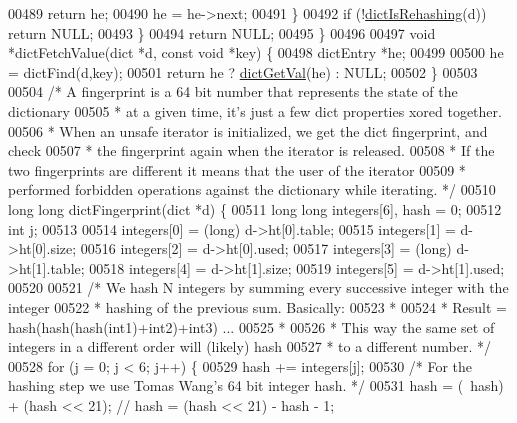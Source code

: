 \begin{DoxyCode}
00489                 \textcolor{keywordflow}{return} he;
00490             he = he->next;
00491         \}
00492         \textcolor{keywordflow}{if} (!\hyperlink{dict_8h_aa6e4917a6a32fdf47180e03ed8969e02}{dictIsRehashing}(d)) \textcolor{keywordflow}{return} NULL;
00493     \}
00494     \textcolor{keywordflow}{return} NULL;
00495 \}
00496 
00497 \textcolor{keywordtype}{void} *dictFetchValue(dict *d, \textcolor{keyword}{const} \textcolor{keywordtype}{void} *key) \{
00498     dictEntry *he;
00499 
00500     he = dictFind(d,key);
00501     \textcolor{keywordflow}{return} he ? \hyperlink{dict_8h_ae8d2cc391873b2bea2b87c4f80f43120}{dictGetVal}(he) : NULL;
00502 \}
00503 
00504 \textcolor{comment}{/* A fingerprint is a 64 bit number that represents the state of the dictionary}
00505 \textcolor{comment}{ * at a given time, it's just a few dict properties xored together.}
00506 \textcolor{comment}{ * When an unsafe iterator is initialized, we get the dict fingerprint, and check}
00507 \textcolor{comment}{ * the fingerprint again when the iterator is released.}
00508 \textcolor{comment}{ * If the two fingerprints are different it means that the user of the iterator}
00509 \textcolor{comment}{ * performed forbidden operations against the dictionary while iterating. */}
00510 \textcolor{keywordtype}{long} \textcolor{keywordtype}{long} dictFingerprint(dict *d) \{
00511     \textcolor{keywordtype}{long} \textcolor{keywordtype}{long} integers[6], hash = 0;
00512     \textcolor{keywordtype}{int} j;
00513 
00514     integers[0] = (\textcolor{keywordtype}{long}) d->ht[0].table;
00515     integers[1] = d->ht[0].size;
00516     integers[2] = d->ht[0].used;
00517     integers[3] = (\textcolor{keywordtype}{long}) d->ht[1].table;
00518     integers[4] = d->ht[1].size;
00519     integers[5] = d->ht[1].used;
00520 
00521     \textcolor{comment}{/* We hash N integers by summing every successive integer with the integer}
00522 \textcolor{comment}{     * hashing of the previous sum. Basically:}
00523 \textcolor{comment}{     *}
00524 \textcolor{comment}{     * Result = hash(hash(hash(int1)+int2)+int3) ...}
00525 \textcolor{comment}{     *}
00526 \textcolor{comment}{     * This way the same set of integers in a different order will (likely) hash}
00527 \textcolor{comment}{     * to a different number. */}
00528     \textcolor{keywordflow}{for} (j = 0; j < 6; j++) \{
00529         hash += integers[j];
00530         \textcolor{comment}{/* For the hashing step we use Tomas Wang's 64 bit integer hash. */}
00531         hash = (~hash) + (hash << 21); \textcolor{comment}{// hash = (hash << 21) - hash - 1;}

\end{DoxyCode}
